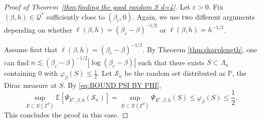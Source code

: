 \documentclass[10pt,a4paper]{amsart}
\numberwithin{equation}{section}
\begin{document}
\begin{proof}[Proof of Theorem~\textup{\ref{thm:finding the good random S d=4}}] Let $\varepsilon>0$.
Fix $(\beta,h)\in \mathcal Q^*$ sufficiently close to $(\beta_c,0)$. Again, we use two different arguments depending on whether $\ell(\beta,h)=(\beta_c-\beta)^{-1/2}$ or $\ell(\beta,h)=h^{-1/3}$. 

 Assume first that $\ell(\beta,h)=(\beta_c-\beta)^{-1/2}$. By Theorem \ref{thm:sharplength}, one can find $n\lesssim (\beta_c-\beta)^{-1/2}|\log (\beta_c-\beta)|$ such that there exists $S\subset \Lambda_n$ containing $0$ with $\varphi_{\beta}(S)\leq \tfrac{1}{2}$. Let $\mathcal S_n$ be the random set distributed as $\mathbb P$, the Dirac measure at $S$. By \eqref{eq:BOUND PSI BY PHI},
\begin{equation}
	\sup_{E\subset E(\mathbb Z^d)}\mathbb E[\Psi_{E^c,\beta,h}(\mathcal S_n)]=\sup_{E\subset E(\mathbb Z^d)}\Psi_{E^c,\beta,h}(S)\leq \varphi_{\beta}(S)\leq \frac{1}{2}.
\end{equation}
This concludes the proof in this case.


\end{proof}
\end{document}
